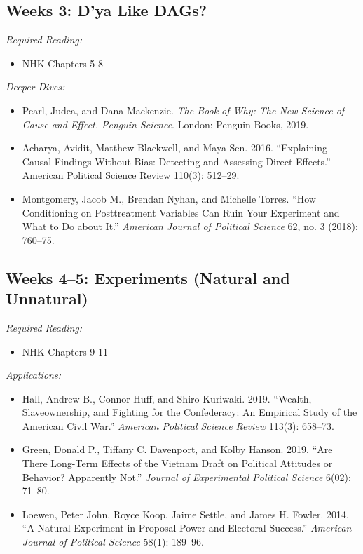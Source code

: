 \documentclass[11pt, letterpaper]{article}
\begin{document}
\subsection*{Weeks 3: D'ya Like DAGs?}

\textit{Required Reading:}

\begin{itemize}
	\item NHK Chapters 5-8
\end{itemize}

\noindent \textit{Deeper Dives:}

\begin{itemize}
	\item Pearl, Judea, and Dana Mackenzie. \textit{The Book of Why: The New Science of Cause and Effect. Penguin Science}. London: Penguin Books, 2019.
	\item Acharya, Avidit, Matthew Blackwell, and Maya Sen. 2016. ``Explaining Causal Findings Without Bias: Detecting and Assessing Direct Effects.'' American Political Science Review 110(3): 512–29.
	\item Montgomery, Jacob M., Brendan Nyhan, and Michelle Torres. ``How Conditioning on Posttreatment Variables Can Ruin Your Experiment and What to Do about It.'' \textit{American Journal of Political Science} 62, no. 3 (2018): 760–75.
\end{itemize}

\subsection*{Weeks 4--5: Experiments (Natural and Unnatural)}

\textit{Required Reading:}

\begin{itemize}
	\item NHK Chapters 9-11

\end{itemize}

\noindent \textit{Applications:}

\begin{itemize}
	\item Hall, Andrew B., Connor Huff, and Shiro Kuriwaki. 2019. ``Wealth, Slaveownership, and Fighting for the Confederacy: An Empirical Study of the American Civil War.'' \textit{American Political Science Review} 113(3): 658–73.
	\item Green, Donald P., Tiffany C. Davenport, and Kolby Hanson. 2019. ``Are There Long-Term Effects of the Vietnam Draft on Political Attitudes or Behavior? Apparently Not.'' \textit{Journal of Experimental Political Science} 6(02): 71–80.
	\item Loewen, Peter John, Royce Koop, Jaime Settle, and James H. Fowler. 2014. “A Natural Experiment in Proposal Power and Electoral Success.” \textit{American Journal of Political Science} 58(1): 189–96.
\end{itemize}
\end{document}
